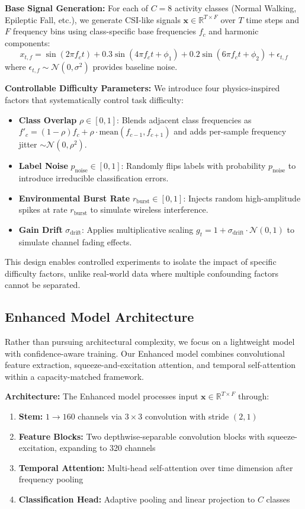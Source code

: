 \documentclass[10pt,conference]{IEEEtran}
\begin{document}
\textbf{Base Signal Generation:} For each of $C=8$ activity classes (Normal Walking, Epileptic Fall, etc.), we generate CSI-like signals $\mathbf{x} \in \mathbb{R}^{T \times F}$ over $T$ time steps and $F$ frequency bins using class-specific base frequencies $f_c$ and harmonic components:
\begin{equation}
x_{t,f} = \sin(2\pi f_c t) + 0.3\sin(4\pi f_c t + \phi_1) + 0.2\sin(6\pi f_c t + \phi_2) + \epsilon_{t,f}
\end{equation}
where $\epsilon_{t,f} \sim \mathcal{N}(0, \sigma^2)$ provides baseline noise.

\textbf{Controllable Difficulty Parameters:} We introduce four physics-inspired factors that systematically control task difficulty:
\begin{itemize}
\item \textbf{Class Overlap} $\rho \in [0,1]$: Blends adjacent class frequencies as $f'_c = (1-\rho)f_c + \rho \cdot \text{mean}(f_{c-1}, f_{c+1})$ and adds per-sample frequency jitter $\sim \mathcal{N}(0, \rho^2)$.
\item \textbf{Label Noise} $p_{\text{noise}} \in [0,1]$: Randomly flips labels with probability $p_{\text{noise}}$ to introduce irreducible classification errors.
\item \textbf{Environmental Burst Rate} $r_{\text{burst}} \in [0,1]$: Injects random high-amplitude spikes at rate $r_{\text{burst}}$ to simulate wireless interference.
\item \textbf{Gain Drift} $\sigma_{\text{drift}}$: Applies multiplicative scaling $g_t = 1 + \sigma_{\text{drift}} \cdot \mathcal{N}(0,1)$ to simulate channel fading effects.
\end{itemize}

This design enables controlled experiments to isolate the impact of specific difficulty factors, unlike real-world data where multiple confounding factors cannot be separated.

\subsection{Enhanced Model Architecture}
Rather than pursuing architectural complexity, we focus on a lightweight model with confidence-aware training. Our Enhanced model combines convolutional feature extraction, squeeze-and-excitation attention, and temporal self-attention within a capacity-matched framework.

\textbf{Architecture:} The Enhanced model processes input $\mathbf{x} \in \mathbb{R}^{T \times F}$ through:
\begin{enumerate}
\item \textbf{Stem:} $1 \to 160$ channels via $3 \times 3$ convolution with stride $(2,1)$
\item \textbf{Feature Blocks:} Two depthwise-separable convolution blocks with squeeze-excitation, expanding to 320 channels
\item \textbf{Temporal Attention:} Multi-head self-attention over time dimension after frequency pooling
\item \textbf{Classification Head:} Adaptive pooling and linear projection to $C$ classes
\end{enumerate}
\end{document}
